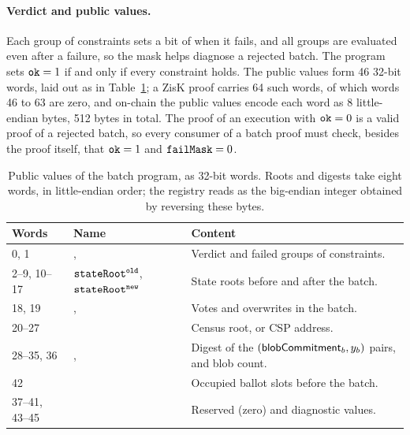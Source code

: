 \paragraph{Verdict and public values.} Each group of constraints sets a bit of \failmask when it fails, and all groups are evaluated even after a failure, so the mask helps diagnose a rejected batch. The program sets $\texttt{ok} = 1$ if and only if every constraint holds. The public values form 46 32-bit words, laid out as in Table~\ref{tab:batch-outputs}; a ZisK proof carries 64 such words, of which words 46 to 63 are zero, and on-chain the public values encode each word as 8 little-endian bytes, 512 bytes in total. The proof of an execution with $\texttt{ok} = 0$ is a valid proof of a rejected batch, so every consumer of a batch proof must check, besides the proof itself, that $\texttt{ok} = 1$ and $\texttt{failMask} = 0$.

\begin{table}[h]
	\centering
	\caption{Public values of the batch program, as 32-bit words. Roots and digests take eight words, in little-endian order; the registry reads \censusroot as the big-endian integer obtained by reversing these bytes.}
	\label{tab:batch-outputs}
	\small
	\begin{tabular}{p{} p{} p{}}
		\toprule
		\textbf{Words} & \textbf{Name} & \textbf{Content} \\
		\midrule
		0, 1 & \okflag, \failmask & Verdict and failed groups of constraints. \\
		2--9, 10--17 & $\texttt{stateRoot}^\texttt{old}$, $\texttt{stateRoot}^\texttt{new}$ & State roots before and after the batch. \\
		18, 19 & \numvotes, \numoverwrites & Votes and overwrites in the batch. \\
		20--27 & \censusroot & Census root, or \ac{CSP} address. \\
		28--35, 36 & \blobsdigest, \nblobs & Digest of the $({\sf{blobCommitment}}_b, y_b)$ pairs, and blob count. \\
		42 & \occupiedbefore & Occupied ballot slots before the batch. \\
		37--41, 43--45 & & Reserved (zero) and diagnostic values. \\
		\bottomrule
	\end{tabular}
\end{table}

